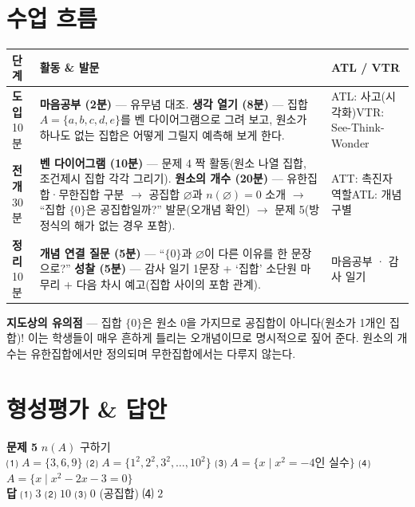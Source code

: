 \documentclass[11pt,a4paper]{article}
\begin{document}
\section{수업 흐름}
\begin{tabularx}{\linewidth}{@{}>{\centering\arraybackslash}p{1.6cm}X>{\raggedright\arraybackslash\small}p{3.1cm}@{}}
\toprule
\textbf{단계} & \textbf{활동 \& 발문} & \textbf{ATL / VTR} \\
\midrule
\textcolor{goldstrong}{\textbf{도입}}\newline\footnotesize 10분 &
\textbf{마음공부 (2분)} --- 유무념 대조.\newline
\textbf{생각 열기 (8분)} --- 집합 $A=\{a,b,c,d,e\}$를 벤 다이어그램으로 그려 보고, 원소가 하나도 없는 집합은 어떻게 그릴지 예측해 보게 한다. &
ATL: 사고(시각화)\newline VTR: See-Think-Wonder \\
\addlinespace
\textcolor{goldstrong}{\textbf{전개}}\newline\footnotesize 30분 &
\textbf{벤 다이어그램 (10분)} --- 문제 4 짝 활동(원소 나열 집합, 조건제시 집합 각각 그리기).\newline
\textbf{원소의 개수 (20분)} --- 유한집합·무한집합 구분 $\to$ 공집합 $\varnothing$과 $n(\varnothing)=0$ 소개 $\to$ ``집합 $\{0\}$은 공집합일까?'' 발문(오개념 확인) $\to$ 문제 5(방정식의 해가 없는 경우 포함). &
ATT: 촉진자 역할\newline ATL: 개념 구별 \\
\addlinespace
\textcolor{goldstrong}{\textbf{정리}}\newline\footnotesize 10분 &
\textbf{개념 연결 질문 (5분)} --- ``$\{0\}$과 $\varnothing$이 다른 이유를 한 문장으로?''\newline
\textbf{성찰 (5분)} --- 감사 일기 1문장 + `집합' 소단원 마무리 + 다음 차시 예고(집합 사이의 포함 관계). &
마음공부 · 감사 일기 \\
\bottomrule
\end{tabularx}

\begin{calloutbox}
\textbf{지도상의 유의점} --- 집합 $\{0\}$은 원소 $0$을 가지므로 공집합이 아니다(원소가 1개인 집합)! 이는 학생들이 매우 흔하게 틀리는 오개념이므로 명시적으로 짚어 준다. 원소의 개수는 유한집합에서만 정의되며 무한집합에서는 다루지 않는다.
\end{calloutbox}

\section{형성평가 \& 답안}
\begin{answerbox}
\textbf{문제 5} \quad $n(A)$ 구하기\\
\small ⑴ $A=\{3,6,9\}$ \quad ⑵ $A=\{1^2,2^2,3^2,\dots,10^2\}$ \quad ⑶ $A=\{x\mid x^2=-4$인 실수$\}$ \quad ⑷ $A=\{x\mid x^2-2x-3=0\}$\\[4pt]
\textbf{\color{goldstrong}답} \; ⑴ $3$ \quad ⑵ $10$ \quad ⑶ $0$ (공집합) \quad ⑷ $2$
\end{answerbox}
\end{document}
